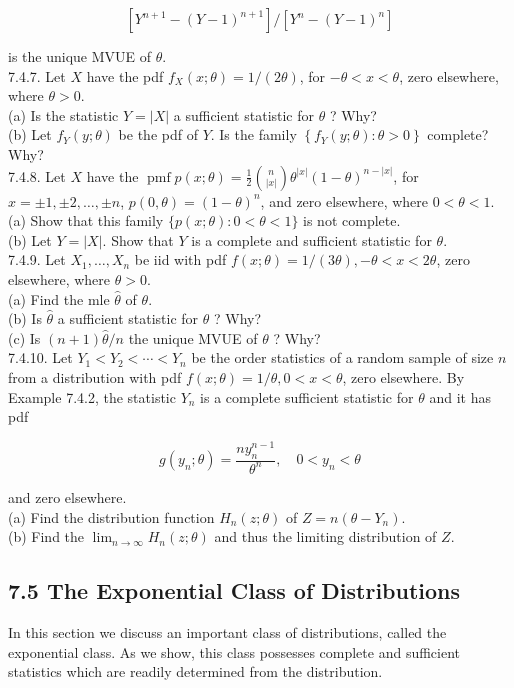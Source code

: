 $$
\left[Y^{n+1}-(Y-1)^{n+1}\right] /\left[Y^{n}-(Y-1)^{n}\right]
$$

is the unique MVUE of $\theta$.\\
7.4.7. Let $X$ have the pdf $f_{X}(x ; \theta)=1 /(2 \theta)$, for $-\theta<x<\theta$, zero elsewhere, where $\theta>0$.\\
(a) Is the statistic $Y=|X|$ a sufficient statistic for $\theta$ ? Why?\\
(b) Let $f_{Y}(y ; \theta)$ be the pdf of $Y$. Is the family $\left\{f_{Y}(y ; \theta): \theta>0\right\}$ complete? Why?\\
7.4.8. Let $X$ have the $\operatorname{pmf} p(x ; \theta)=\frac{1}{2}\binom{n}{|x|} \theta^{|x|}(1-\theta)^{n-|x|}$, for $x= \pm 1, \pm 2, \ldots, \pm n$, $p(0, \theta)=(1-\theta)^{n}$, and zero elsewhere, where $0<\theta<1$.\\
(a) Show that this family $\{p(x ; \theta): 0<\theta<1\}$ is not complete.\\
(b) Let $Y=|X|$. Show that $Y$ is a complete and sufficient statistic for $\theta$.\\
7.4.9. Let $X_{1}, \ldots, X_{n}$ be iid with pdf $f(x ; \theta)=1 /(3 \theta),-\theta<x<2 \theta$, zero elsewhere, where $\theta>0$.\\
(a) Find the mle $\hat{\theta}$ of $\theta$.\\
(b) Is $\widehat{\theta}$ a sufficient statistic for $\theta$ ? Why?\\
(c) Is $(n+1) \hat{\theta} / n$ the unique MVUE of $\theta$ ? Why?\\
7.4.10. Let $Y_{1}<Y_{2}<\cdots<Y_{n}$ be the order statistics of a random sample of size $n$ from a distribution with pdf $f(x ; \theta)=1 / \theta, 0<x<\theta$, zero elsewhere. By Example 7.4.2, the statistic $Y_{n}$ is a complete sufficient statistic for $\theta$ and it has pdf

$$
g\left(y_{n} ; \theta\right)=\frac{n y_{n}^{n-1}}{\theta^{n}}, \quad 0<y_{n}<\theta
$$

and zero elsewhere.\\
(a) Find the distribution function $H_{n}(z ; \theta)$ of $Z=n\left(\theta-Y_{n}\right)$.\\
(b) Find the $\lim _{n \rightarrow \infty} H_{n}(z ; \theta)$ and thus the limiting distribution of $Z$.

\subsection*{7.5 The Exponential Class of Distributions}
In this section we discuss an important class of distributions, called the exponential class. As we show, this class possesses complete and sufficient statistics which are readily determined from the distribution.

